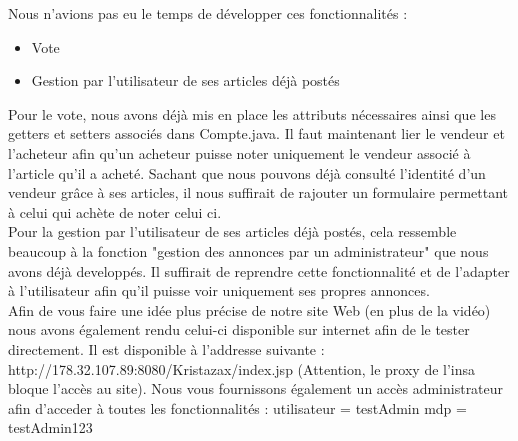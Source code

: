 Nous n'avions pas eu le temps de développer ces fonctionnalités : 

\begin{itemize}
	\item Vote
	\item Gestion par l'utilisateur de ses articles déjà postés
\end{itemize}

Pour le vote, nous avons déjà mis en place les attributs nécessaires ainsi que les getters et setters associés dans Compte.java. Il faut maintenant lier le vendeur et l'acheteur afin qu'un acheteur puisse noter uniquement le vendeur associé à l'article qu'il a acheté. Sachant que nous pouvons déjà consulté l'identité d'un vendeur grâce à ses articles, il nous suffirait de rajouter un formulaire permettant à celui qui achète de noter celui ci.\\
Pour la gestion par l'utilisateur de ses articles déjà postés, cela ressemble beaucoup à la fonction "gestion des annonces par un administrateur" que nous avons déjà developpés. Il suffirait de reprendre cette fonctionnalité et de l'adapter à l'utilisateur afin qu'il puisse voir uniquement ses propres annonces.\\
Afin de vous faire une idée plus précise de notre site Web (en plus de la vidéo) nous avons également rendu celui-ci disponible sur internet afin de le tester directement. Il est disponible à l'addresse suivante : http://178.32.107.89:8080/Kristazax/index.jsp (Attention, le proxy de l'insa bloque l'accès au site). Nous vous fournissons également un accès administrateur afin d'acceder à toutes les fonctionnalités : utilisateur = testAdmin mdp = testAdmin123\\

\\


